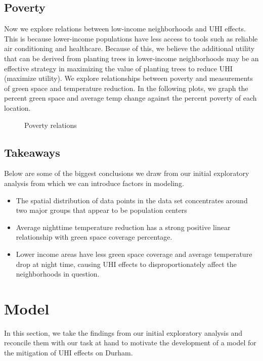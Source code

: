 \documentclass[11pt]{article}
\begin{document}
\subsection{Poverty}
Now we explore relations between low-income neighborhoods and UHI effects. This is because lower-income populations have less access to tools such as reliable air conditioning and healthcare. Because of this, we believe the additional utility that can be derived from planting trees in lower-income neighborhoods may be an effective strategy in maximizing the value of planting trees to reduce UHI (maximize utility). We explore relationships between poverty and measurements of green space and temperature reduction. In the following plots, we graph the percent green space and average temp change against the percent poverty of each location.
\begin{figure}[H]
    \centering
    \caption{Poverty relations}
    \label{fig:fig}
\end{figure}

\subsection{Takeaways}
Below are some of the biggest conclusions we draw from our initial exploratory analysis from which we can introduce factors in modeling.
\begin{itemize}
  \item The spatial distribution of data points in the data set concentrates around two major groups that appear to be population centers
  \item Average nighttime temperature reduction has a strong positive linear relationship with green space coverage percentage.
  \item Lower income areas have less green space coverage and average temperature drop at night time, causing UHI effects to disproportionately affect the neighborhoods in question.
\end{itemize}
\pagebreak

\section{Model}
In this section, we take the findings from our initial exploratory analysis and reconcile them with our task at hand to motivate the development of a model for the mitigation of UHI effects on Durham.
\end{document}
